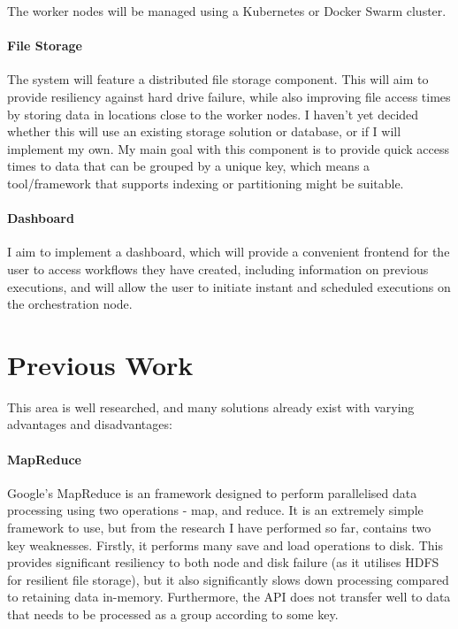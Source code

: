 \documentclass[12pt]{article}
\begin{document}
	The worker nodes will be managed using a Kubernetes or Docker Swarm cluster.
	
	\paragraph{File Storage}
	The system will feature a distributed file storage component. This will aim to provide resiliency against hard drive failure, while also improving file access times by storing data in locations close to the worker nodes. I haven't yet decided whether this will use an existing storage solution or database, or if I will implement my own. My main goal with this component is to provide quick access times to data that can be grouped by a unique key, which means a tool/framework that supports indexing or partitioning might be suitable.
	
	\paragraph{Dashboard}
	I aim to implement a dashboard, which will provide a convenient frontend for the user to access workflows they have created, including information on previous executions, and will allow the user to initiate instant and scheduled executions on the orchestration node.
	
	\section{Previous Work}

	This area is well researched, and many solutions already exist with varying advantages and disadvantages:
	
	\paragraph{MapReduce}
	Google’s MapReduce \cite{dean2008mapreduce} is an framework designed to perform parallelised data processing using two operations - map, and reduce. It is an extremely simple framework to use, but from the research I have performed so far, contains two key weaknesses. Firstly, it performs many save and load operations to disk. This provides significant resiliency to both node and disk failure (as it utilises HDFS for resilient file storage), but it also significantly slows down processing compared to retaining data in-memory. Furthermore, the API does not transfer well to data that needs to be processed as a group according to some key.
	
\end{document}
